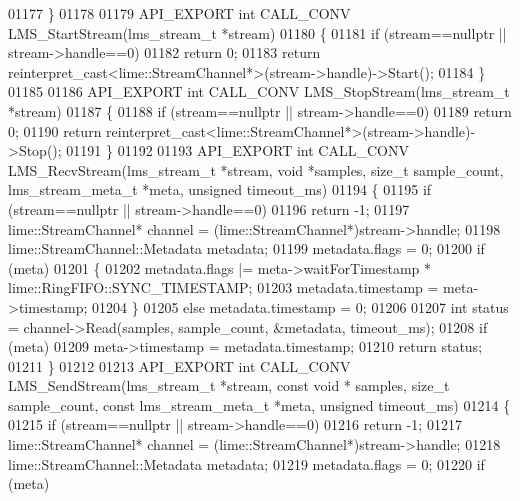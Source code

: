 \begin{DoxyCode}
01177 \}
01178 
01179 API_EXPORT \textcolor{keywordtype}{int} CALL_CONV LMS_StartStream(lms_stream_t *stream)
01180 \{
01181     \textcolor{keywordflow}{if} (stream==\textcolor{keyword}{nullptr} || stream->handle==0)
01182         \textcolor{keywordflow}{return} 0;
01183     \textcolor{keywordflow}{return} \textcolor{keyword}{reinterpret\_cast<}lime::StreamChannel*\textcolor{keyword}{>}(stream->handle)->Start();
01184 \}
01185 
01186 API_EXPORT \textcolor{keywordtype}{int} CALL_CONV LMS_StopStream(lms_stream_t *stream)
01187 \{
01188     \textcolor{keywordflow}{if} (stream==\textcolor{keyword}{nullptr} || stream->handle==0)
01189         \textcolor{keywordflow}{return} 0;
01190     \textcolor{keywordflow}{return} \textcolor{keyword}{reinterpret\_cast<}lime::StreamChannel*\textcolor{keyword}{>}(stream->handle)->Stop();
01191 \}
01192 
01193 API_EXPORT \textcolor{keywordtype}{int} CALL_CONV LMS_RecvStream(lms_stream_t *stream, \textcolor{keywordtype}{void} *samples, \textcolor{keywordtype}{size\_t} 
      sample_count, lms_stream_meta_t *meta, \textcolor{keywordtype}{unsigned} timeout_ms)
01194 \{
01195     \textcolor{keywordflow}{if} (stream==\textcolor{keyword}{nullptr} || stream->handle==0)
01196         \textcolor{keywordflow}{return} -1;
01197     lime::StreamChannel* channel = (lime::StreamChannel*)stream->handle;
01198     lime::StreamChannel::Metadata metadata;
01199     metadata.flags = 0;
01200     if (meta)
01201     \{
01202         metadata.flags |= meta->waitForTimestamp * 
      lime::RingFIFO::SYNC_TIMESTAMP;
01203         metadata.timestamp = meta->timestamp;
01204     \}
01205     \textcolor{keywordflow}{else} metadata.timestamp = 0;
01206 
01207     \textcolor{keywordtype}{int} status = channel->Read(samples, sample\_count, &metadata, timeout\_ms);
01208     \textcolor{keywordflow}{if} (meta)
01209         meta->timestamp = metadata.timestamp;
01210     \textcolor{keywordflow}{return} status;
01211 \}
01212 
01213 API_EXPORT \textcolor{keywordtype}{int} CALL_CONV LMS_SendStream(lms_stream_t *stream, \textcolor{keyword}{const} \textcolor{keywordtype}{void} *
      samples, \textcolor{keywordtype}{size\_t} sample_count, \textcolor{keyword}{const} lms_stream_meta_t *meta, \textcolor{keywordtype}{unsigned} timeout_ms)
01214 \{
01215     \textcolor{keywordflow}{if} (stream==\textcolor{keyword}{nullptr} || stream->handle==0)
01216         \textcolor{keywordflow}{return} -1;
01217     lime::StreamChannel* channel = (lime::StreamChannel*)stream->handle;
01218     lime::StreamChannel::Metadata metadata;
01219     metadata.flags = 0;
01220     if (meta)

\end{DoxyCode}
